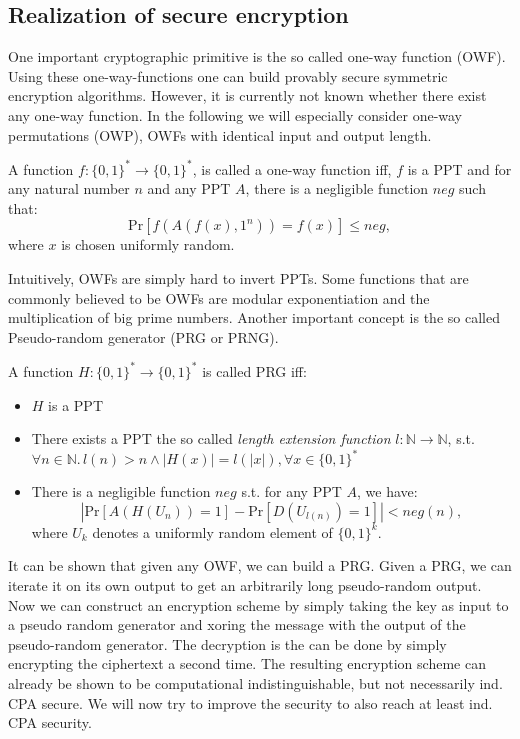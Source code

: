 \subsection{Realization of secure encryption}
One important cryptographic primitive is the so called one-way function (OWF). Using these one-way-functions one can build provably secure symmetric encryption algorithms. However, it is currently not known whether there exist any one-way function. In the following we will especially consider one-way permutations (OWP), OWFs with identical input and output length. 
\begin{definition}
 A function $f:\{0,1\}^*\to \{0,1\}^*$, is called a one-way function iff, $f$ is a PPT and for any natural number $n$ and any PPT $A$, there is a negligible function $neg$ such that: $$\mathrm{Pr}\left[f(A(f(x),1^n))=f(x)\right]\leq neg,$$ where $x$ is chosen uniformly random.
\end{definition}
Intuitively, OWFs are simply hard to invert PPTs. Some functions that are commonly believed to be OWFs are modular exponentiation and the multiplication of big prime numbers. 
Another important concept is the so called Pseudo-random generator (PRG or PRNG). 
\begin{definition}[PRGs]
 A function $H:\{0,1\}^*\to \{0,1\}^*$ is called PRG iff:
 \begin{itemize}
  \item $H$ is a PPT
  \item There exists a PPT the so called \emph{length extension function} $l:\mathbb{N}\to\mathbb{N}$, s.t. $\forall n\in\mathbb{N}.\,l(n)>n\land \left|H(x)\right|=l(\left|x\right|), \forall x\in\{0,1\}^*$
  \item There is a negligible function $neg$ s.t. for any PPT $A$, we have:
  $$\left|\mathrm{Pr}\left[A(H(U_n))=1\right]-\mathrm{Pr}\left[D(U_{l(n)})=1\right]\right|<neg(n),$$ where $U_k$ denotes a uniformly random element of $\{0,1\}^k$. 
 \end{itemize}
\end{definition}
It can be shown that given any OWF, we can build a PRG. %
Given a PRG, we can iterate it on its own output to get an arbitrarily long pseudo-random output. Now we can construct an encryption scheme by simply taking the key as input to a pseudo random generator and xoring the message with the output of the pseudo-random generator. The decryption is the can be done by simply encrypting the ciphertext a second time. The resulting encryption scheme can already be shown to be computational indistinguishable, but not necessarily ind. CPA secure. We will now try to improve the security to also reach at least ind. CPA security. 
